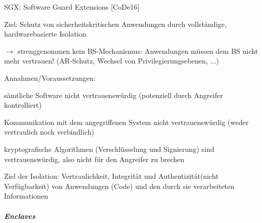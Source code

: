 \documentclass[a4paper]{article}
\begin{document}
\begin{multicols}{3}
    \begin{itemize*}
        \item
        SGX: Software Guard Extensions [CoDe16]
        \item
        Ziel: Schutz von sicherheitskritischen Anwendungen durch vollständige,
        hardwarebasierte Isolation
        \item
        $\rightarrow$ strenggenommen kein BS-Mechanismus:
        Anwendungen müssen dem BS nicht mehr vertrauen! (AR-Schutz, Wechsel
        von Privilegierungsebenen, ...)
        \item
        Annahmen/Voraussetzungen:
        \begin{enumerate*}

            \item sämtliche Software nicht vertrauenswürdig (potenziell durch Angreifer kontrolliert)
            \item Kommunikation mit dem angegriffenen System nicht vertrauenswürdig (weder vertraulich noch verbindlich)
            \item kryptografische Algorithmen (Verschlüsselung und Signierung) sind vertrauenswürdig, also nicht für den Angreifer zu brechen
            \item Ziel der Isolation: Vertraulichkeit, Integrität und Authentizität(nicht Verfügbarkeit) von Anwendungen (Code) und den durch sie verarbeiteten Informationen
        \end{enumerate*}
    \end{itemize*}


    \subparagraph{Enclaves}


\end{multicols}
\end{document}
